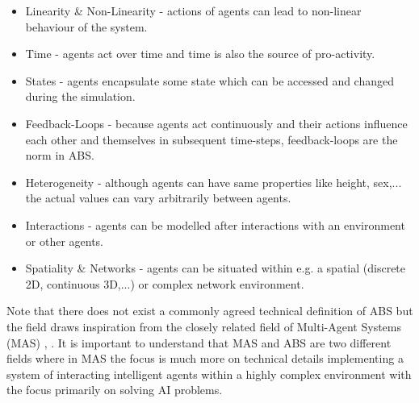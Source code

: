 \begin{itemize}
	\item Linearity \& Non-Linearity - actions of agents can lead to non-linear behaviour of the system.
	\item Time - agents act over time and time is also the source of pro-activity.
	\item States - agents encapsulate some state which can be accessed and changed during the simulation.
	\item Feedback-Loops - because agents act continuously and their actions influence each other and themselves in subsequent time-steps, feedback-loops are the norm in ABS. 
	\item Heterogeneity - although agents can have same properties like height, sex,... the actual values can vary arbitrarily between agents.
	\item Interactions - agents can be modelled after interactions with an environment or other agents. %
	\item Spatiality \& Networks - agents can be situated within e.g. a spatial (discrete 2D, continuous 3D,...) or complex network environment. %
\end{itemize}

Note that there does not exist a commonly agreed technical definition of ABS but the field draws inspiration from the closely related field of Multi-Agent Systems (MAS) \cite{wooldridge_introduction_2009}, \cite{weiss_multiagent_2013}. It is important to understand that MAS and ABS are two different fields where in MAS the focus is much more on technical details implementing a system of interacting intelligent agents within a highly complex environment with the focus primarily on solving AI problems.

%
%
